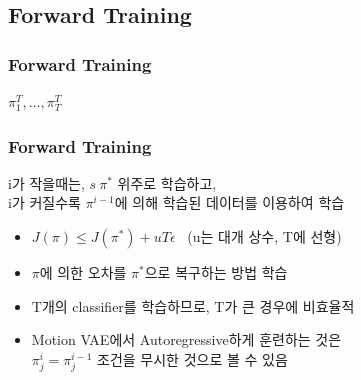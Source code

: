 \documentclass[11pt,xcolor={dvipsnames},hyperref={pdftex,pdfpagemode=UseNone,hidelinks,pdfdisplaydoctitle=true},usepdftitle=false]{beamer}
\begin{document}
\begin{frame}
\end{frame}

\subsection*{Forward Training}
\begin{frame}
\frametitle{Forward Training}
\begin{algorithm}[H]
    \SetAlgoLined
    \Return $\pi_1^T, \ldots, \pi_T^T$\;
\end{algorithm}
\end{frame}


\begin{frame}
\frametitle{Forward Training}
i가 작을때는, $s~\pi^*$ 위주로 학습하고, \\ 
i가 커질수록 $\pi^{i-1}$에 의해 학습된 데이터를 이용하여 학습    

\vspace{5mm}

\begin{itemize}
    \item $J(\pi) \leq  J(\pi^*) + u T \epsilon$ \, (u는 대개 상수, T에 선형)
    \item $\pi$에 의한 오차를 $\pi^*$으로 복구하는 방법 학습
    \item T개의 classifier를 학습하므로, T가 큰 경우에 비효율적
    \item Motion VAE에서 Autoregressive하게 훈련하는 것은 \\ $\pi_j^i = \pi_j^{i-1}$ 조건을 무시한 것으로 볼 수 있음
\end{itemize}
\end{frame}
    
\end{document}
